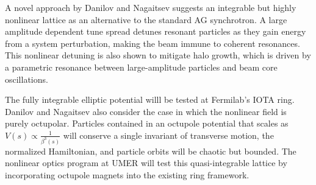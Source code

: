A novel approach by Danilov and Nagaitsev suggests an integrable but highly nonlinear lattice as an alternative to the standard AG synchrotron.\cite{Nagaitsev} 
A large amplitude dependent tune spread detunes resonant particles as they gain energy from a system perturbation, making the beam immune to coherent resonances.
This nonlinear detuning is also shown to mitigate halo growth, which is driven by a parametric resonance between large-amplitude particles and beam core oscillations.\cite{Webb}

The fully integrable elliptic potential willl be tested at Fermilab's IOTA ring.\cite{iotafma} Danilov and Nagaitsev also consider the case in which the nonlinear field is purely octupolar. 
Particles contained in an octupole potential that scales as $V(s) \propto \frac{1}{\beta^3(s)}$ will conserve a single invariant of transverse motion, the normalized Hamiltonian, and particle orbits will be chaotic but bounded. 
The nonlinear optics program at UMER will test this quasi-integrable lattice by incorporating octupole magnets into the existing ring framework. 


